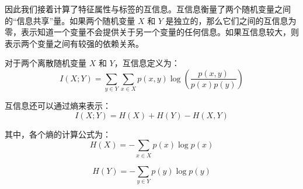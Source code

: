   
  因此我们接着计算了特征属性与标签的互信息。互信息衡量了两个随机变量之间的“信息共享”量。如果两个随机变量 $X$ 和 $Y$ 是独立的，那么它们之间的互信息为零，表示知道一个变量不会提供关于另一个变量的任何信息。如果互信息较大，则表示两个变量之间有较强的依赖关系。
 
对于两个离散随机变量 \(X\) 和 \(Y\)，互信息定义为：
\begin{equation}
I(X; Y) = \sum_{y \in Y} \sum_{x \in X} p(x, y) \log \left(\frac{p(x, y)}{p(x) p(y)}\right)
\label{eq:mutual_information}
\end{equation}

互信息还可以通过熵来表示：
\begin{equation}
I(X; Y) = H(X) + H(Y) - H(X, Y)
\label{eq:mutual_information_entropy}
\end{equation}

其中，各个熵的计算公式为：
\begin{equation}
H(X) = -\sum_{x \in X} p(x) \log p(x)
\label{eq:entropy_x}
\end{equation}

\begin{equation}
H(Y) = -\sum_{y \in Y} p(y) \log p(y)
\label{eq:entropy_y}
\end{equation}

